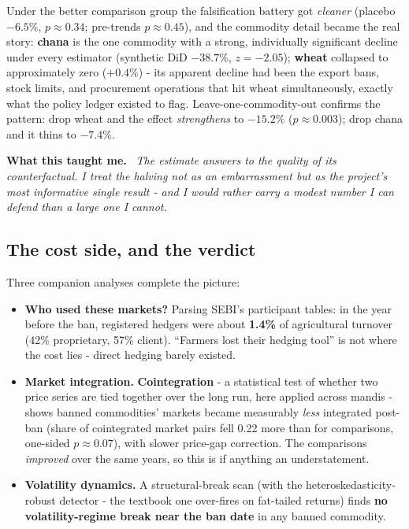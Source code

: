 \documentclass[11pt]{article}
\newenvironment{lesson}
  {\begin{framed}\noindent\textbf{What this taught me.}\ \itshape}
  {\end{framed}}
\begin{document}
Under the better comparison group the falsification battery got \emph{cleaner} (placebo
$-6.5\%$, $p\approx0.34$; pre-trends $p\approx0.45$), and the commodity detail became the
real story: \textbf{chana} is the one commodity with a strong, individually significant
decline under every estimator (synthetic DiD $-38.7\%$, $z=-2.05$); \textbf{wheat}
collapsed to approximately zero ($+0.4\%$) - its apparent decline had been the export
bans, stock limits, and procurement operations that hit wheat simultaneously, exactly what
the policy ledger existed to flag. Leave-one-commodity-out confirms the pattern: drop
wheat and the effect \emph{strengthens} to $-15.2\%$ ($p\approx0.003$); drop chana and it
thins to $-7.4\%$.

\begin{lesson}
The estimate answers to the quality of its counterfactual. I treat the halving not as an
embarrassment but as the project's most informative single result - and I would rather
carry a modest number I can defend than a large one I cannot.
\end{lesson}

\subsection{The cost side, and the verdict}

Three companion analyses complete the picture:

\begin{itemize}[leftmargin=1.8em,itemsep=1pt]
  \item \textbf{Who used these markets?} Parsing SEBI's participant tables: in the year
        before the ban, registered hedgers were about \textbf{1.4\%} of agricultural
        turnover (42\% proprietary, 57\% client). ``Farmers lost their hedging tool'' is
        not where the cost lies - direct hedging barely existed.
  \item \textbf{Market integration.} \textbf{Cointegration} - a statistical test of
        whether two price series are tied together over the long run, here applied across
        mandis - shows banned commodities' markets became measurably \emph{less}
        integrated post-ban (share of cointegrated market pairs fell 0.22 more than for
        comparisons, one-sided $p\approx0.07$), with slower price-gap correction. The
        comparisons \emph{improved} over the same years, so this is if anything an
        understatement.
  \item \textbf{Volatility dynamics.} A structural-break scan (with the
        heteroskedasticity-robust detector - the textbook one over-fires on fat-tailed
        returns) finds \textbf{no volatility-regime break near the ban date} in any banned
        commodity.
\end{itemize}
\end{document}
